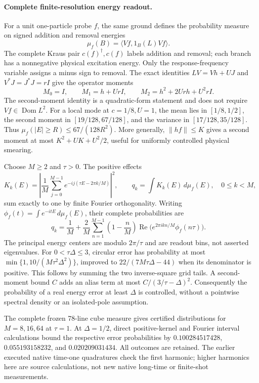\paragraph{Complete finite-resolution energy readout.}
For a unit one-particle probe $f$, the same ground defines the probability
measure on signed addition and removal energies
\[
 \mu_f(B)=\langle Vf,1_B(L)Vf\rangle.
\]
The complete Kraus pair $c(f)^\dagger,c(f)$ labels addition
and removal; each branch has a nonnegative physical excitation energy.
Only the response-frequency variable assigns a minus sign to removal.
The exact identities $LV=Vh+UJ$ and
$V^*J=J^*J=rI$ give the operator moments
\[
 M_0=I,\qquad M_1=h+UrI,\qquad
 M_2=h^2+2Urh+U^2rI.
\]
The second-moment identity is a quadratic-form statement and does not
require $Vf\in\operatorname{Dom}L^2$.
For a local mode at $c=1/8,U=1$, the mean lies in $[1/8,1/2]$, the second
moment in $[19/128,67/128]$, and the variance in $[17/128,35/128]$.
Thus $\mu_f(|E|\ge R)\le67/(128R^2)$.
More generally, $\|hf\|\le K$ gives a second moment at most
$K^2+UK+U^2/2$, useful for uniformly controlled physical smearing.

Choose $M\ge2$ and $\tau>0$.  The positive effects
\[
 K_k(E)=\left|\frac1M\sum_{j=0}^{M-1}
 e^{-ij(\tau E-2\pi k/M)}\right|^2,\qquad
 q_k=\int K_k(E)\,d\mu_f(E),\quad 0\le k<M,
\]
sum exactly to one by finite Fourier orthogonality.  Writing
$\phi_f(t)=\int e^{-itE}\,d\mu_f(E)$, their complete probabilities are
\[
 q_k=\frac1M+\frac2M\sum_{n=1}^{M-1}
 \left(1-\frac nM\right)\operatorname{Re}
 \bigl(e^{2\pi ikn/M}\phi_f(n\tau)\bigr).
\]
The principal energy centers are modulo $2\pi/\tau$ and are readout bins,
not asserted eigenvalues.  For $0<\tau\Delta\le3$, circular error has
probability at most $\min\{1,10/(M\tau^2\Delta^2)\}$, improved to
$22/(7M\tau\Delta-44)$ when its denominator is positive.  This follows
by summing the two inverse-square grid tails.  A second-moment bound $C$
adds an alias term at most $C/(3/\tau-\Delta)^2$.  Consequently the
probability of a real energy error at least $\Delta$ is controlled,
without a pointwise spectral density or an isolated-pole assumption.

The complete frozen 78-line cube measure gives certified distributions
for $M=8,16,64$ at $\tau=1$.  At $\Delta=1/2$, direct positive-kernel
and Fourier interval calculations bound the respective error probabilities
by $0.100284517428$, $0.055193158232$, and $0.020209031434$.
All outcomes are retained.  The earlier executed native time-one
quadratures check the first harmonic; higher harmonics here are source
calculations, not new native long-time or finite-shot measurements.

